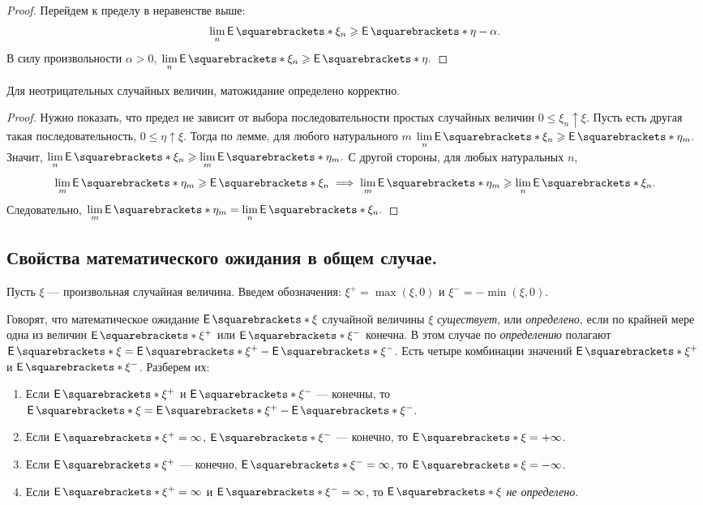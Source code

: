 \begin{enumerate}
\begin{proof}
            Перейдем к пределу в неравенстве выше: \[\lim\limits_{n}\E{\xi_n} \geq \E{\eta} - \alpha. \]
            В силу произвольности \(\alpha > 0 \), \(\lim\limits_{n}\E{\xi_n} \geq \E{\eta}. \)
        \end{proof}    
    \begin{consequence}
        Для неотрицательных случайных величин, матожидание определено корректно.
    \end{consequence}
    \begin{proof}
        Нужно показать, что предел не зависит от выбора последовательности простых случайных величин \(0 \leq \xi_n \uparrow \xi. \) Пусть есть другая такая последовательность, \(0 \leq \eta \uparrow \xi. \) Тогда по лемме, для любого натурального $ m $ \(\lim\limits_{n}\E{\xi_n} \geq \E{\eta_m}. \) Значит, \(\lim\limits_{n}\E{\xi_n} \geq \lim\limits_{m}\E{\eta_m}. \)
        С другой стороны, для любых натуральных $ n $, \[\lim\limits_{m}\E{\eta_m} \geq \E{\xi_n} \implies \lim\limits_{m}\E{\eta_m} \geq \lim\limits_{n}\E{\xi_n}. \]
        Следовательно, \(\lim\limits_{m}\E{\eta_m} = \lim\limits_{n}\E{\xi_n}. \)
    \end{proof}
\end{enumerate}

\subsection {Свойства математического ожидания в общем случае.}
    Пусть $ \xi $ --- произвольная случайная величина. Введем обозначения: \(\xi^+ = \max(\xi, 0) \) и \(\xi^- = -\min(\xi, 0). \)

\begin{definition}
    Говорят, что математическое ожидание \(\E{\xi} \) случайной величины $ \xi $ \emph{существует}, или \emph{определено}, если по крайней мере одна из величин $ \E{\xi^+} $ или $ \E{\xi^-} $ конечна. В этом случае по \emph{определению} полагают \( \E{\xi} = \E{\xi^+} - \E{\xi^-} \).    
    Есть четыре комбинации значений $ \E{\xi^+} $ и $ \E{\xi^-} $. Разберем их:
    \begin{enumerate}
        \item Если $ \E{\xi^+} $ и $ \E{\xi^-} $ --- конечны, то \( \E{\xi} = \E{\xi^+} - \E{\xi^-} \).
        \item Если  $ \E{\xi^+} = \infty $, $ \E{\xi^-} $ --- конечно, то $ \E{\xi} = +\infty $.
        \item Если  $ \E{\xi^+} $ --- конечно, $ \E{\xi^-} = \infty $, то $ \E{\xi} = -\infty $.
        \item Если  $ \E{\xi^+} = \infty $ и $ \E{\xi^-} = \infty $, то $ \E{\xi} $ \emph{не определено}.
    \end{enumerate}
\end{definition}

